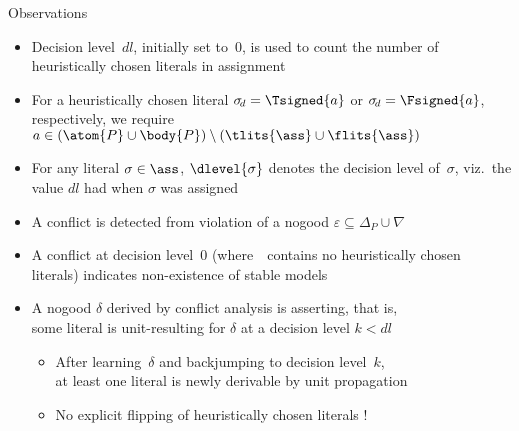 \begin{frame}[c]%
\SetAlFnt{\scriptsize}

\end{frame}
\begin{frame}{Observations}
\begin{itemize}
\item Decision level~$\mathit{dl}$,
      initially set to~$0$,
      is used to count the number of heuristically chosen
      literals in assignment~\ass
\item For a heuristically chosen literal
      $\sigma_{\!d}=\Tsigned{a}$ or $\sigma_{\!d}=\Fsigned{a}$,
      respectively,
      we require $a\in(\atom{P}\cup\body{P})\setminus(\tlits{\ass}\cup\flits{\ass})$
\item For any literal $\sigma\in\ass$,
      $\dlevel{\sigma}$ denotes the decision level of~$\sigma$,
      viz.\ the value $\mathit{dl}$ had when $\sigma$ was assigned
\pause
\item A conflict is detected from violation of a nogood $\varepsilon\subseteq\Delta_P\cup\nabla$
\item A conflict at decision level~$0$
      (where~\ass\ contains no heuristically chosen literals)
      indicates non-existence of stable models
\item A nogood $\delta$ derived by conflict analysis is
      \alert{asserting}, that is,\\
      some literal is unit-resulting for $\delta$ at a decision level $k<\mathit{dl}$
\pause
  \begin{itemize}
  \item After learning~$\delta$ and backjumping to
                  decision level~$k$,\\ at least one literal is
                  newly derivable by unit propagation
  \item No explicit flipping of heuristically chosen literals !
  \end{itemize}
\end{itemize}
\end{frame}
